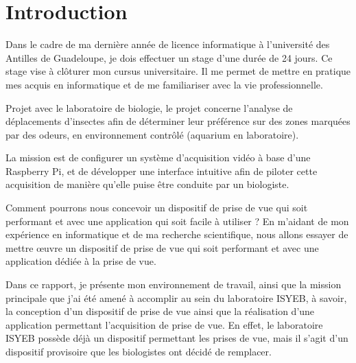 \chapter{Introduction}
    Dans le cadre de ma dernière année de licence informatique à l'université des Antilles de Guadeloupe, je dois effectuer un stage d'une durée de 24 jours. Ce stage vise à clôturer mon cursus universitaire.
    Il me permet de mettre en pratique mes acquis en informatique et de me familiariser avec la vie professionnelle.

    \vspace{0.2cm}

    Projet avec le laboratoire de biologie, le projet concerne l'analyse de déplacements d'insectes afin de déterminer leur préférence sur des zones marquées par des odeurs, en environnement contrôlé (aquarium en laboratoire).

    \vspace{0.2cm}

    La mission est de configurer un système d'acquisition vidéo à base d'une Raspberry Pi, et de développer une interface intuitive afin de piloter cette acquisition de manière qu'elle puise être conduite par un biologiste.

    \vspace{0.2cm}

    Comment pourrons nous concevoir un dispositif de prise de vue qui soit performant et avec une application qui soit facile à utiliser ? 
    En m'aidant de mon expérience en informatique et de ma recherche scientifique, nous allons essayer de mettre œuvre un dispositif de prise de vue qui soit performant et avec une application dédiée à la prise de vue.

    \vspace{0.2cm}

    Dans ce rapport, je présente mon environnement de travail, ainsi que la mission principale que j'ai été amené à accomplir au sein du laboratoire ISYEB, à savoir, la conception d'un dispositif de prise de vue ainsi que la réalisation d'une application permettant l'acquisition de prise de vue.
    En effet, le laboratoire ISYEB possède déjà un dispositif permettant les prises de vue, mais il s'agit d'un dispositif provisoire que les biologistes ont décidé de remplacer.


